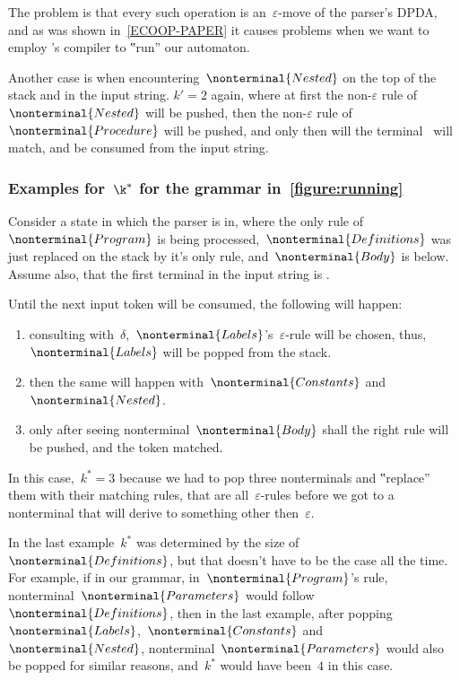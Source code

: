 The problem is that every such operation is
  an~$ε$-move of the parser's DPDA, and as was shown in~\cref{ECOOP-PAPER}
  it causes problems when we want to employ \Java's compiler to ‟run” our
  automaton.

Another case is when encountering~$\nonterminal{Nested}$ on the top of the stack
  and  in the input string.
$k'=2$ again, where at first the non-$ε$ rule of~$\nonterminal{Nested}$ will
  be pushed, then the non-$ε$ rule of~$\nonterminal{Procedure}$ will be
  pushed, and only then will the terminal~ will match,
  and be consumed from the input string.

\subsubsection{Examples for~$\k^*$ for the grammar in~\cref{figure:running}}
Consider a state in which the parser is in, where the
  only rule of~$\nonterminal{Program}$ is being processed,~$\nonterminal{Definitions}$
  was just replaced on the stack by it's only rule, and~$\nonterminal{Body}$ is below.
Assume also, that the first terminal in the input string is .

Until the next input token will be consumed, the following will happen:
  \begin{enumerate}
    \item consulting with~$δ$,~$\nonterminal{Labels}$'s~$ε$-rule will
      be chosen, thus,~$\nonterminal{Labels}$ will be popped from the stack.
    \item then the same will happen with~$\nonterminal{Constants}$ and~$\nonterminal{Nested}$.
    \item only after seeing nonterminal~$\nonterminal{Body}$ shall the right rule will be
      pushed, and the token matched.
  \end{enumerate}
In this case,~$k^*=3$ because we had to pop three nonterminals and ‟replace” them with
  their matching rules, that are all~$ε$-rules before we got to a nonterminal
  that will derive to something other then~$ε$.

In the last example~$k^*$ was determined by the size of~$\nonterminal{Definitions}$, but that
  doesn't have to be the case all the time.
For example, if in our grammar, in~$\nonterminal{Program}$'s rule,
  nonterminal~$\nonterminal{Parameters}$ would follow~$\nonterminal{Definitions}$,
  then in the last example, after popping~$\nonterminal{Labels}$,~$\nonterminal{Constants}$
  and~$\nonterminal{Nested}$, nonterminal~$\nonterminal{Parameters}$ would also be popped
  for similar reasons, and~$k^*$ would have been~$4$ in this case.


